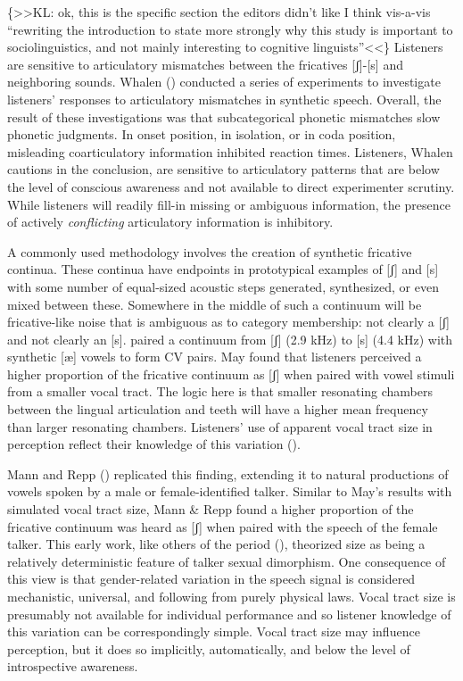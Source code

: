 \documentclass[
  man,
  longtable,
  nolmodern,
  notxfonts,
  notimes,
  colorlinks=true,linkcolor=blue,citecolor=blue,urlcolor=blue]{apa7}
\begin{document}
\{\textgreater\textgreater KL: ok, this is the specific section the
editors didn't like I think vis-a-vis ``rewriting the introduction to
state more strongly why this study is important to sociolinguistics, and
not mainly interesting to cognitive linguists''\textless\textless\}
Listeners are sensitive to articulatory mismatches between the
fricatives {[}ʃ{]}-{[}s{]} and neighboring sounds. Whalen
() conducted a series of experiments to
investigate listeners' responses to articulatory mismatches in synthetic
speech. Overall, the result of these investigations was that
subcategorical phonetic mismatches slow phonetic judgments. In onset
position, in isolation, or in coda position, misleading coarticulatory
information inhibited reaction times. Listeners, Whalen cautions in the
conclusion, are sensitive to articulatory patterns that are below the
level of conscious awareness and not available to direct experimenter
scrutiny. While listeners will readily fill-in missing or ambiguous
information, the presence of actively \emph{conflicting} articulatory
information is inhibitory.

A commonly used methodology involves the creation of synthetic fricative
continua. These continua have endpoints in prototypical examples of
{[}ʃ{]} and {[}s{]} with some number of equal-sized acoustic steps
generated, synthesized, or even mixed between these. Somewhere in the
middle of such a continuum will be fricative-like noise that is
ambiguous as to category membership: not clearly a {[}ʃ{]} and not
clearly an {[}s{]}. \cite{May1976} paired a continuum from {[}ʃ{]} (2.9
kHz) to {[}s{]} (4.4 kHz) with synthetic {[}æ{]} vowels to form CV
pairs. May found that listeners perceived a higher proportion of the
fricative continuum as {[}ʃ{]} when paired with vowel stimuli from a
smaller vocal tract. The logic here is that smaller resonating chambers
between the lingual articulation and teeth will have a higher mean
frequency than larger resonating chambers. Listeners' use of apparent
vocal tract size in perception reflect their knowledge of this variation
().

Mann and Repp () replicated this
finding, extending it to natural productions of vowels spoken by a male
or female-identified talker. Similar to May's results with simulated
vocal tract size, Mann \& Repp found a higher proportion of the
fricative continuum was heard as {[}ʃ{]} when paired with the speech of
the female talker. This early work, like others of the period
(), theorized size as being a
relatively deterministic feature of talker sexual dimorphism. One
consequence of this view is that gender-related variation in the speech
signal is considered mechanistic, universal, and following from purely
physical laws. Vocal tract size is presumably not available for
individual performance and so listener knowledge of this variation can
be correspondingly simple. Vocal tract size may influence perception,
but it does so implicitly, automatically, and below the level of
introspective awareness.
\end{document}
